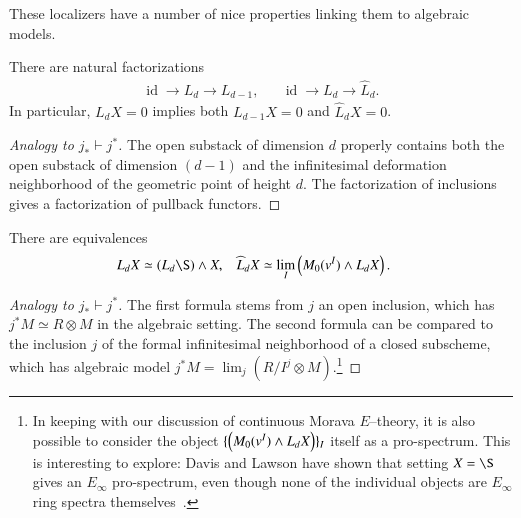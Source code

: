 These localizers have a number of nice properties linking them to algebraic models.

\begin{lemma}
There are natural factorizations
\begin{align*}
\operatorname{id} \to L_d \to L_{d-1}, & & \operatorname{id} \to L_d \to \widehat L_d.
\end{align*}
In particular, $L_d X = 0$ implies both $L_{d-1} X = 0$ and $\widehat L_d X = 0$.
\end{lemma}
\begin{proof}[Analogy to $j_* \vdash j^*$]
The open substack of dimension $d$ properly contains both the open substack of dimension $(d-1)$ and the infinitesimal deformation neighborhood of the geometric point of height $d$.  The factorization of inclusions gives a factorization of pullback functors.
\end{proof}

\begin{lemma}\label{FormulaForKnLocalization}
There are equivalences
\begin{align*}
L_d X & \simeq (L_d \S) \sm X, &
\widehat L_d X & \simeq \lim_I \left( M_0(v^I) \sm L_d X \right).
\end{align*}
\end{lemma}
\begin{proof}[Analogy to $j_* \vdash j^*$]
The first formula stems from $j$ an open inclusion, which has $j^* M \simeq R \otimes M$ in the algebraic setting.  The second formula can be compared to the inclusion $j$ of the formal infinitesimal neighborhood of a closed subscheme, which has algebraic model $j^* M = \lim_j (R/I^j \otimes M)$.\footnote{In keeping with our discussion of continuous Morava $E$--theory, it is also possible to consider the object $\{\left( M_0(v^I) \wedge L_d X \right)\}_I$ itself as a pro-spectrum.  This is interesting to explore: Davis and Lawson have shown that setting $X = \S$ gives an $E_\infty$ pro-spectrum, even though none of the individual objects are $E_\infty$ ring spectra themselves~\cite{DavisLawson}.}
\end{proof}

